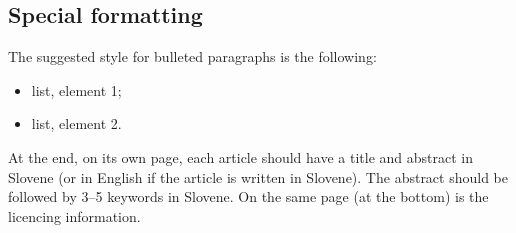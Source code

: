 \documentclass{article}
\begin{document}
\subsection{Special formatting}
The suggested style for bulleted paragraphs is the following:
\begin{itemize}
    \item list, element 1;
    \item list, element 2.
\end{itemize}






\newpage
{}
\begin{abstracteng}
At the end, on its own page, each article should have a title and abstract in Slovene (or in English if the article is written in Slovene). The abstract should be followed by 3--5 keywords in Slovene.  On the same page (at the bottom) is the licencing information.
\end{abstracteng}

\end{document}
